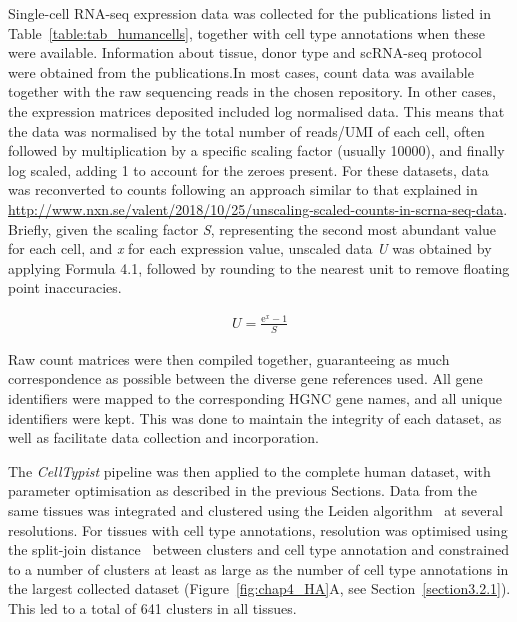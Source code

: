 Single-cell RNA-seq expression data was collected for the publications listed in Table~\ref{table:tab_humancells}, together with cell type annotations when these were available. Information about tissue, donor type and scRNA-seq protocol were obtained from the publications.In most cases, count data was available together with the raw sequencing reads in the chosen repository. In other cases, the expression matrices deposited included log normalised data. This means that the data was normalised by the total number of reads/UMI of each cell, often followed by multiplication by a specific scaling factor (usually 10000), and finally log scaled, adding 1 to account for the zeroes present. For these datasets, data was reconverted to counts following an approach similar to that explained in \url{http://www.nxn.se/valent/2018/10/25/unscaling-scaled-counts-in-scrna-seq-data}. Briefly, given the scaling factor \textit{S}, representing the second most abundant value for each cell, and \textit{x} for each expression value, unscaled data \textit{U} was obtained by applying Formula 4.1, followed by rounding to the nearest unit to remove floating point inaccuracies.

\begin{align}
U = \frac{\mathrm{e}^{x} - 1}{S}
\end{align}

Raw count matrices were then compiled together, guaranteeing as much correspondence as possible between the diverse gene references used. All gene identifiers were mapped to the corresponding HGNC gene names, and all unique identifiers were kept. This was done to maintain the integrity of each dataset, as well as facilitate data collection and incorporation.

The \textit{CellTypist} pipeline was then applied to the complete human dataset, with parameter optimisation as described in the previous Sections. Data from the same tissues was integrated and clustered using the Leiden algorithm~\citep{traag_louvain_2019} at several resolutions. For tissues with cell type annotations, resolution was optimised using the split-join distance~\citep{dongen_performance_2000} between clusters and cell type annotation and constrained to a number of clusters at least as large as the number of cell type annotations in the largest collected dataset (Figure~\ref{fig:chap4_HA}A, see Section~\ref{section3.2.1}). This led to a total of 641 clusters in all tissues.

